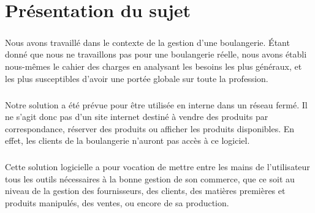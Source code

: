 \chapter{Présentation du sujet}

\paragraph{}
    Nous avons travaillé dans le contexte de la gestion d'une boulangerie.
    Étant donné que nous ne travaillons pas pour une boulangerie réelle, nous avons
    établi nous-mêmes le cahier des charges en analysant les besoins les plus
    généraux, et les plus susceptibles d'avoir une portée globale sur toute
    la profession.
\paragraph{}
    Notre solution a été prévue pour être utilisée en interne dans un réseau
    fermé. Il ne s'agit donc pas d'un site internet destiné à vendre des
    produits par correspondance, réserver des produits ou afficher les produits
    disponibles. En effet, les clients de la boulangerie n'auront pas accès à ce
    logiciel.
\paragraph{}
    Cette solution logicielle a pour vocation de mettre entre les mains de 
    l'utilisateur tous les outils nécessaires à la bonne gestion de son
    commerce, que ce soit au niveau de la gestion des fournisseurs, des
    clients, des matières premières et produits manipulés, des ventes,
    ou encore de sa production.
